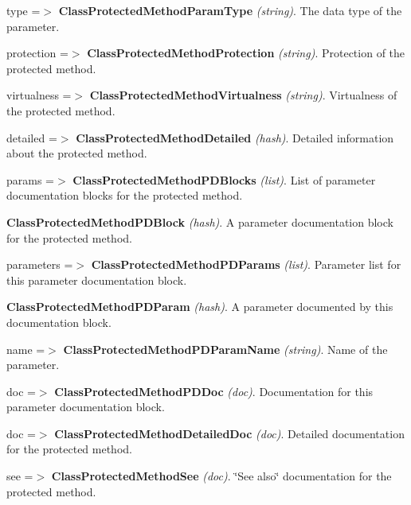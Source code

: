 \begin{DoxyItemize}
\begin{DoxyItemize}
\begin{DoxyItemize}
\begin{DoxyItemize}
\begin{DoxyItemize}
\begin{DoxyItemize}
\begin{DoxyItemize}
\begin{DoxyItemize}
\begin{DoxyItemize}
\item type =$>$ {\bfseries ClassProtectedMethodParamType} {\itshape (string)\/}. The data type of the parameter. 
\end{DoxyItemize}
\end{DoxyItemize}
\item protection =$>$ {\bfseries ClassProtectedMethodProtection} {\itshape (string)\/}. Protection of the protected method. 
\item virtualness =$>$ {\bfseries ClassProtectedMethodVirtualness} {\itshape (string)\/}. Virtualness of the protected method. 
\item detailed =$>$ {\bfseries ClassProtectedMethodDetailed} {\itshape (hash)\/}. Detailed information about the protected method. 
\begin{DoxyItemize}
\item params =$>$ {\bfseries ClassProtectedMethodPDBlocks} {\itshape (list)\/}. List of parameter documentation blocks for the protected method. 
\begin{DoxyItemize}
\item {\bfseries ClassProtectedMethodPDBlock} {\itshape (hash)\/}. A parameter documentation block for the protected method. 
\begin{DoxyItemize}
\item parameters =$>$ {\bfseries ClassProtectedMethodPDParams} {\itshape (list)\/}. Parameter list for this parameter documentation block. 
\begin{DoxyItemize}
\item {\bfseries ClassProtectedMethodPDParam} {\itshape (hash)\/}. A parameter documented by this documentation block. 
\begin{DoxyItemize}
\item name =$>$ {\bfseries ClassProtectedMethodPDParamName} {\itshape (string)\/}. Name of the parameter. 
\end{DoxyItemize}
\end{DoxyItemize}
\item doc =$>$ {\bfseries ClassProtectedMethodPDDoc} {\itshape (doc)\/}. Documentation for this parameter documentation block. 
\end{DoxyItemize}
\end{DoxyItemize}
\item doc =$>$ {\bfseries ClassProtectedMethodDetailedDoc} {\itshape (doc)\/}. Detailed documentation for the protected method. 
\item see =$>$ {\bfseries ClassProtectedMethodSee} {\itshape (doc)\/}. \char`\"{}See also\char`\"{} documentation for the protected method. 

\end{DoxyItemize}
\end{DoxyItemize}
\end{DoxyItemize}
\end{DoxyItemize}
\end{DoxyItemize}
\end{DoxyItemize}
\end{DoxyItemize}
\end{DoxyItemize}
